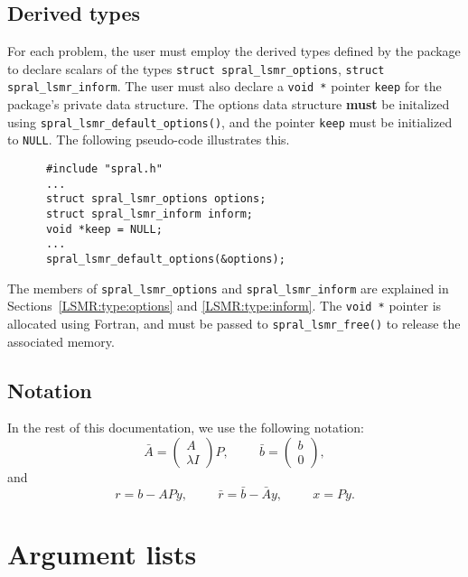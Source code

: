 
\subsection{Derived types}

For each problem, the user must employ the derived types defined by the
package to declare scalars of the types
{\tt struct spral\_lsmr\_options}, {\tt struct spral\_lsmr\_inform}. The user
must also
declare a \texttt{void~*} pointer {\tt keep} for the package's private data
structure. The options data structure \textbf{must} be initalized using
\texttt{spral\_lsmr\_default\_options()}, and the pointer \texttt{keep} must be
initialized to \texttt{NULL}.
The following pseudo-code illustrates this.
\begin{verbatim}
      #include "spral.h"
      ...
      struct spral_lsmr_options options;
      struct spral_lsmr_inform inform;
      void *keep = NULL;
      ...
      spral_lsmr_default_options(&options);
\end{verbatim}
The members of {\tt spral\_lsmr\_options} and {\tt spral\_lsmr\_inform} are
explained in Sections~\ref{LSMR:type:options} and \ref{LSMR:type:inform}.
The \texttt{void~*} pointer is allocated using Fortran, and must be passed to
\texttt{spral\_lsmr\_free()} to release the associated memory.

\subsection{Notation}
In the rest of this documentation, we use the following notation:
$$
   \bar{A} = \left( \begin{array}{c}
         A \\
         \lambda I
      \end{array} \right)P, \hspace{1cm} \bar{b} = \left( \begin{array}{c}
         b \\
         0
      \end{array} \right),
$$
and
$$
   r = b - APy , \hspace{1cm}  \bar{r} = \bar{b} - \bar{A}y,
      \hspace{1cm}  x = Py.
$$

\newpage
\section{Argument lists}

